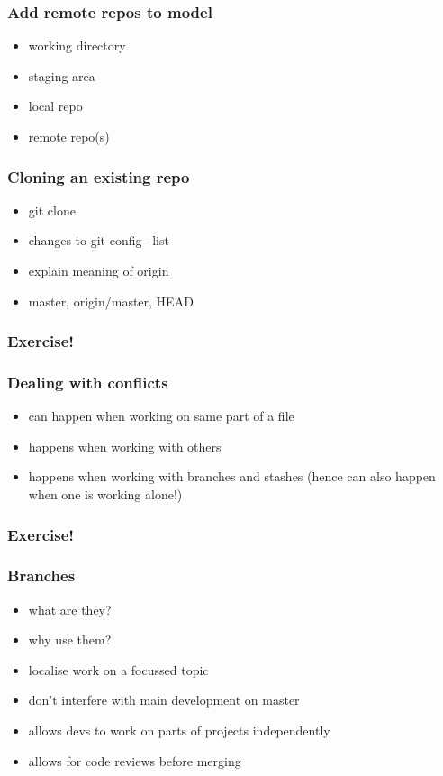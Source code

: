 \documentclass{git_course}
\begin{document}
\begin{frame}
\frametitle{Add remote repos to model}
\begin{itemize}
    \item working directory
    \item staging area
    \item local repo
    \item remote repo(s)
\end{itemize}
\end{frame}

\begin{frame}
\frametitle{Cloning an existing repo}
\begin{itemize}
    \item git clone
    \item changes to git config --list
    \item explain meaning of origin
    \item master, origin/master, HEAD
\end{itemize}
\end{frame}

\begin{frame}
\frametitle{Exercise!}
\end{frame}

\begin{frame}
\frametitle{Dealing with conflicts}
\begin{itemize}
    \item can happen when working on same part of a file
    \item happens when working with others
    \item happens when working with branches and stashes (hence can also
        happen when one is working alone!)
\end{itemize}
\end{frame}

\begin{frame}
\frametitle{Exercise!}
\end{frame}

\begin{frame}
\frametitle{Branches}
\begin{itemize}
    \item what are they?
    \item why use them?
    \item localise work on a focussed topic
    \item don't interfere with main development on master
    \item allows devs to work on parts of projects independently
    \item allows for code reviews before merging
\end{itemize}
\end{frame}
\end{document}
